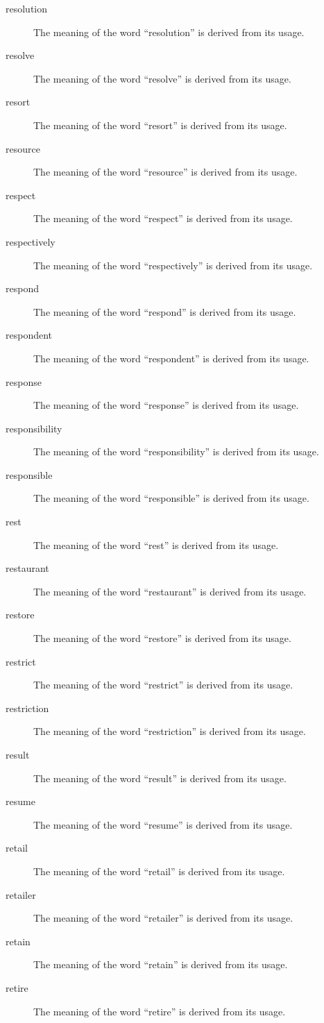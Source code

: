 \documentclass[12pt, letterpaper]{memoir}
\begin{document}
\begin{description}
\item[resolution] The meaning of the word ``resolution'' is derived from its usage.
\item[resolve] The meaning of the word ``resolve'' is derived from its usage.
\item[resort] The meaning of the word ``resort'' is derived from its usage.
\item[resource] The meaning of the word ``resource'' is derived from its usage.
\item[respect] The meaning of the word ``respect'' is derived from its usage.
\item[respectively] The meaning of the word ``respectively'' is derived from its usage.
\item[respond] The meaning of the word ``respond'' is derived from its usage.
\item[respondent] The meaning of the word ``respondent'' is derived from its usage.
\item[response] The meaning of the word ``response'' is derived from its usage.
\item[responsibility] The meaning of the word ``responsibility'' is derived from its usage.
\item[responsible] The meaning of the word ``responsible'' is derived from its usage.
\item[rest] The meaning of the word ``rest'' is derived from its usage.
\item[restaurant] The meaning of the word ``restaurant'' is derived from its usage.
\item[restore] The meaning of the word ``restore'' is derived from its usage.
\item[restrict] The meaning of the word ``restrict'' is derived from its usage.
\item[restriction] The meaning of the word ``restriction'' is derived from its usage.
\item[result] The meaning of the word ``result'' is derived from its usage.
\item[resume] The meaning of the word ``resume'' is derived from its usage.
\item[retail] The meaning of the word ``retail'' is derived from its usage.
\item[retailer] The meaning of the word ``retailer'' is derived from its usage.
\item[retain] The meaning of the word ``retain'' is derived from its usage.
\item[retire] The meaning of the word ``retire'' is derived from its usage.

\end{description}
\end{document}
